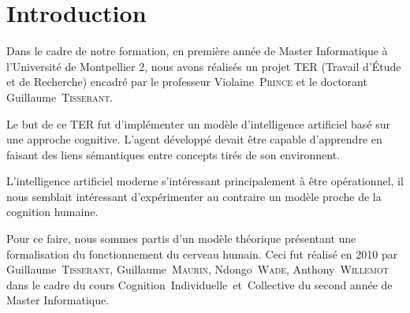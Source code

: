 \chapter*{Introduction}
Dans le cadre de notre formation, en première année de Master Informatique à l'Université de Montpellier 2, nous avons réalisés un projet TER (Travail d'Étude et de Recherche) encadré par le professeur \mbox{Violaine \textsc{Prince}} et le doctorant \mbox{Guillaume \textsc{Tisserant}}.

Le but de ce TER fut d'implémenter un modèle d'intelligence artificiel basé sur une approche cognitive. L'agent développé devait être capable d'apprendre en faisant des liens sémantiques entre concepts tirés de son environnent. 

L'intelligence artificiel moderne s'intéressant principalement à être opérationnel, il nous semblait intéressant d'expérimenter au contraire un modèle proche de la cognition humaine. 

Pour ce faire, nous sommes partis d'un modèle théorique présentant une formalisation du fonctionnement du cerveau humain. Ceci fut réalisé en 2010 par \mbox{Guillaume \textsc{Tisserant}}, \mbox{Guillaume \textsc{Maurin}}, \mbox{Ndongo \textsc{Wade}}, \mbox{Anthony \textsc{Willemot}} dans le cadre du cours \mbox{\og Cognition Individuelle et Collective\fg{}} du second année de Master Informatique.


